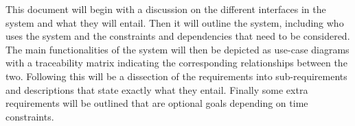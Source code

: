 This document will begin with a discussion on the different interfaces in the system and what they will entail. 
        Then it will outline the system, including who uses the system and the constraints and dependencies that need to be considered.
         The main functionalities of the system will then be depicted as use-case diagrams with a traceability matrix indicating 
         the corresponding relationships between the two. Following this will be a dissection of the requirements into 
         sub-requirements and descriptions that state exactly what they entail. Finally some extra requirements will
          be outlined that are optional goals depending on time constraints.